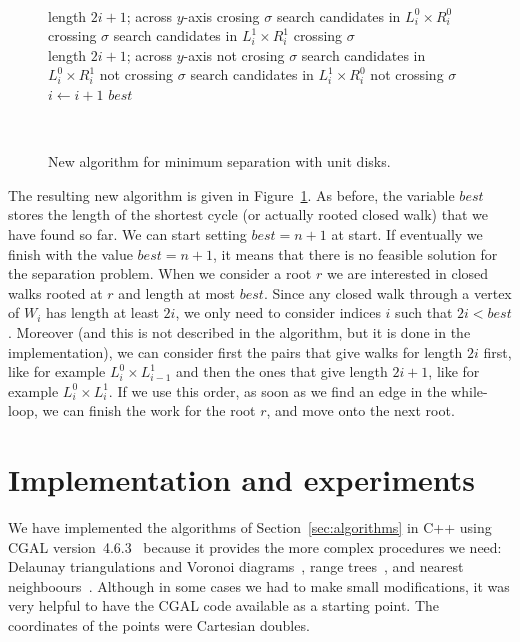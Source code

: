 \documentclass[a4paper,11pt]{article}
\def\best{\mathit{best}}
\begin{document}
\begin{figure}[htb]
\begin{center}
{{\begin{varwidth}{\linewidth}
\begin{codebox}
			\\ \>\> \Comment length $2i+1$; across $y$-axis crosing $\sigma$
			\li search candidates in $L^0_i\times R^0_{i}$ crossing $\sigma$
			\li search candidates in $L^1_i\times R^1_{i}$ crossing $\sigma$
			\\ \>\> \Comment length $2i+1$; across $y$-axis not crosing $\sigma$			
			\li search candidates in $L^0_i\times R^1_{i}$ not crossing $\sigma$
			\li search candidates in $L^1_i\times R^0_{i}$ not crossing $\sigma$
			\li $i \gets i+1$
			\End
		\End
    \li \Return $\best$
    \\[-2mm]
\end{codebox}
\end{varwidth}~~~~}}
\end{center}
\caption{New algorithm for minimum separation with unit disks.}
\label{fig:FULLAlgorithm}
\end{figure}


The resulting new algorithm is given in Figure~\ref{fig:FULLAlgorithm}.
As before, the variable $\best$ stores the length of the shortest cycle (or actually
rooted closed walk) that we have found so far. We can start setting $\best=n+1$
at start.
If eventually we finish with the value $\best=n+1$, it means that there is no
feasible solution for the separation problem.
When we consider a root $r$ we are interested in closed walks rooted at $r$
and length at most $\best$. Since any closed walk through a vertex of $W_i$ has
length at least $2i$, we only need to consider indices $i$ such that $2i<\best$.
Moreover (and this is not described in the algorithm, but it is done
in the implementation), we can consider first
the pairs that give walks for length $2i$ first, like for example $L^0_i\times L^1_{i-1}$ 
and then the ones that give length  $2i+1$, like for example $L^0_i\times L^1_i$.
If we use this order, as soon as we find an edge in 
the while-loop, we can finish the work for the root $r$, and move onto the next root.


\section{Implementation and experiments}
\label{sec:implementation}

We have implemented the algorithms of Section~\ref{sec:algorithms}
in C++ using CGAL version~4.6.3~\cite{cgal}
because it provides the more complex procedures we need:
Delaunay triangulations and Voronoi diagrams~\cite{cgal:k-vda2-15a}, 
range trees~\cite{cgal:n-rstd-15a}, and nearest neighboours~\cite{cgal:tf-ssd-15a}.
Although in some cases we had to make small modifications, it was
very helpful to have the CGAL code available as a starting point. 
The coordinates of the points were Cartesian doubles.
\end{document}
